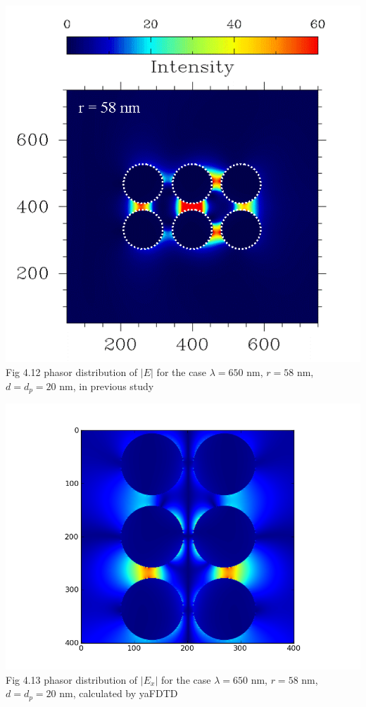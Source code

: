 \documentclass[openany]{book}
\begin{document}
\begin{center}
\includegraphics[scale=0.5]{images/r58.png}\\
Fig 4.12
phasor distribution of $|E|$ for the case $\lambda = 650$ nm, $r = 58$ nm, $d = d_p = 20$ nm, in previous study
\end{center}

\begin{center}
\includegraphics[scale=0.8]{images/ex-r58.png}\\
Fig 4.13
phasor distribution of $|E_x|$ for the case $\lambda = 650$ nm, $r = 58$ nm, $d = d_p = 20$ nm, calculated by yaFDTD
\end{center}
\end{document}
